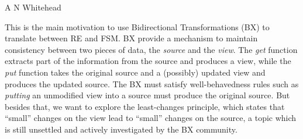 \begin{flushright}
    A N Whitehead
\end{flushright}

This is the main motivation to use Bidirectional Transformations (BX) to translate between RE and FSM. BX provide a mechanism to maintain consistency between two pieces of data, the \textit{source} and the \textit{view}. The \textit{get} function extracts part of the information from the source and produces a view, while the \textit{put} function takes the original source and a (possibly) updated view and produces the updated source. The BX must satisfy well-behavedness rules such as \textit{putting} an unmodified view into a source must produce the original source. But besides that, we want to explore the least-changes principle, which states that ``small'' changes on the view lead to ``small'' changes on the source, a topic which is still unsettled and actively investigated by the BX community.



